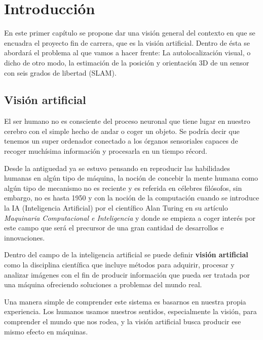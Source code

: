 
\chapter{Introducción} %

\label{Chapter1} %

En este primer capítulo se propone dar una visión general del contexto en que se encuadra el proyecto fin de carrera, que es la visión artificial. Dentro de ésta se abordará el problema al que vamos a hacer frente: La autolocalización visual, o dicho de otro modo, la estimación de la posición y orientación 3D de un sensor con seis grados de libertad (SLAM).

\section{Visión artificial}

El ser humano no es consciente del proceso neuronal que tiene lugar en nuestro cerebro con el simple hecho de andar o coger un objeto. Se podría decir que tenemos un super ordenador conectado a los órganos sensoriales capaces de recoger muchísima información y procesarla en un tiempo récord.

Desde la antiguedad ya se estuvo pensando en reproducir las habilidades humanas en algún tipo de máquina, la noción de concebir la mente humana como algún tipo de mecanismo no es reciente y es referida en célebres filósofos, sin embargo, no es hasta 1950 y con la noción de la computación cuando se introduce la IA (Inteligencia Artificial) por el científico Alan Turing en su artículo \textit{Maquinaria Computacional e Inteligencia} y donde se empieza a coger interés por este campo que será el precursor de una gran cantidad de desarrollos e innovaciones.

Dentro del campo de la inteligencia artificial se puede definir \textbf{visión artificial} como la disciplina científica que incluye métodos para adquirir, procesar y analizar imágenes con el fin de producir información que pueda ser tratada por una máquina ofreciendo soluciones a problemas del mundo real.

Una manera simple de comprender este sistema es basarnos en nuestra propia experiencia. Los humanos usamos nuestros sentidos, especialmente la visión, para comprender el mundo que nos rodea, y la visión artificial busca producir ese mismo efecto en máquinas.

